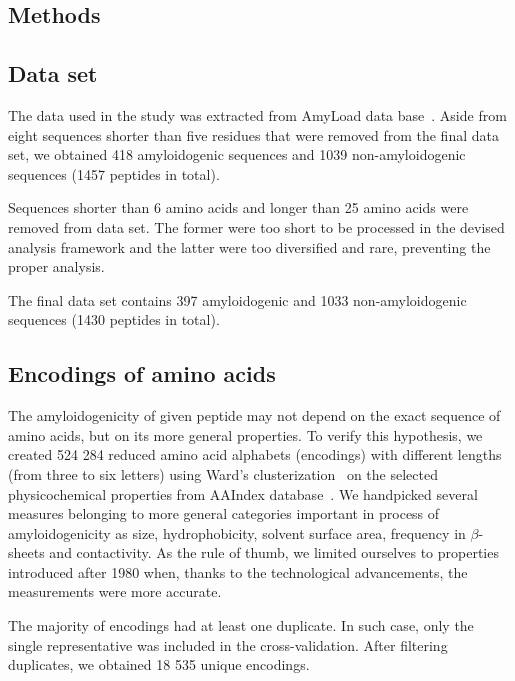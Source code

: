 \documentclass{bioinfo}
\begin{document}
\begin{methods}
\section{Methods}

\subsection{Data set}

The data used in the study was extracted from AmyLoad data 
base~\citep{wozniak_amyload:_2015}. Aside from eight sequences shorter than five 
residues that were removed from the final data set, we obtained 418 
amyloidogenic sequences and 1039 non-amyloidogenic sequences (1457 peptides in 
total).

  Sequences shorter than 6 amino acids and longer than 25 amino acids were 
removed from data set. The former were too short to be processed in the devised 
analysis framework and the latter were too diversified and rare, preventing the 
proper analysis.

  The final data set contains 397 amyloidogenic and 1033 non-amyloidogenic 
sequences (1430 peptides in total).

\subsection{Encodings of amino acids}

The amyloidogenicity of given peptide may not depend on the exact sequence of 
amino acids, but on its more general properties. To verify this hypothesis, we 
created 524 284 reduced amino acid alphabets (encodings) with different lengths 
(from three to six letters) using Ward's 
clusterization~\citep{jr_hierarchical_1963} on the selected physicochemical 
properties from AAIndex database~\citep{kawashima_aaindex:_2008}. We handpicked 
several measures belonging to more general categories important in process of 
amyloidogenicity as size, hydrophobicity, solvent surface area, frequency in 
$\beta$-sheets and contactivity. As the rule of thumb, we limited ourselves to 
properties introduced after 1980 when, thanks to the technological advancements, 
the measurements were more accurate.

  The majority of encodings had at least one duplicate. In such case, only the 
single representative was included in the cross-validation. After filtering 
duplicates, we obtained 18 535 unique encodings.


\end{methods}
\end{document}
